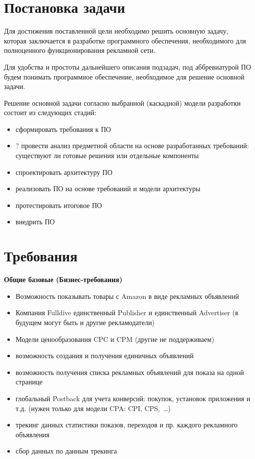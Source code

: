 \documentclass[specification,annotation,times]{itmo-student-thesis}
\begin{document}
\finishrelatedwork %


\section{Постановка задачи}


Для достижения поставленной цели необходимо решить основную задачу, которая заключается в разработке программного обеспечения, необходимого для полноценного функционирования рекламной сети.

Для удобства и простоты дальнейшего описания подзадач, под аббревиатурой ПО будем понимать программное обеспечение, необходимое для решение основной задачи.

Решение основной задачи согласно выбранной (каскадной) модели разработки состоит из следующих стадий:
\begin{itemize}
	\item сформировать требования к ПО
	\item ? провести анализ предметной области на основе разработанных требований: существуют ли готовые решения или отдельные компоненты
	\item спроектировать архитектуру ПО
	\item реализовать ПО на основе требований и модели архитектуры
	\item протестировать итоговое ПО
	\item внедрить ПО
\end{itemize}
\bigbreak


\section{Требования}\label{sec:requirements}


\textbf{Общие базовые (Бизнес-требования)}
\begin{itemize}
	\item Возможность показывать товары с Amazon в виде рекламных объявлений
	\item Компания Fulldive единственный Publisher и единственный Advertiser (в будущем могут быть и другие рекламодатели)
	\item Модели ценообразования CPC и CPM (другие не поддерживаем)
	\item возможность создания и получения единичных объявлений
	\item возможность получения списка рекламных объявлений для показа на одной странице
	\item глобальный Postback для учета конверсий: покупок, установок приложения и т.д. (нужен только для модели CPA: CPI, CPS, …)
	\item трекинг данных статистики показов, переходов и пр. каждого рекламного объявления
	\item сбор данных по данным трекинга
\end{itemize}
\end{document}
